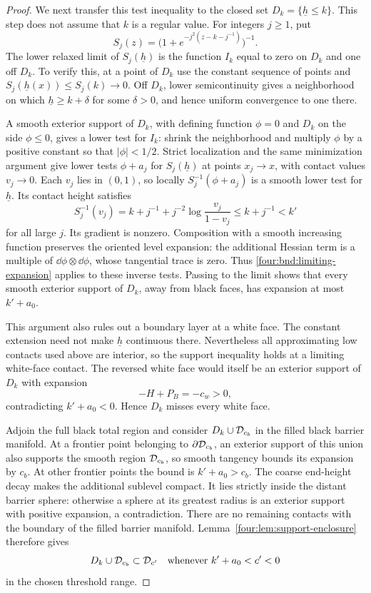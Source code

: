 \begin{proof}
We next transfer this test inequality to the closed set
$D_k=\{\underline h\le k\}$.  This step does not assume that $k$ is a
regular value.  For integers $j\ge1$, put
\[
 S_j(z)=\bigl(1+e^{-j^2(z-k-j^{-1})}\bigr)^{-1}.
\]
The lower relaxed limit of $S_j(\underline h)$ is the function
$I_k$ equal to zero on $D_k$ and one off $D_k$.  To verify this, at a
point of $D_k$ use the constant sequence of points and
$S_j(\underline h(x))\le S_j(k)\to0$.  Off $D_k$, lower
semicontinuity gives a neighborhood on which
$\underline h\ge k+\delta$ for some $\delta>0$, and hence uniform
convergence to one there.

A smooth exterior support of $D_k$, with defining function $\phi=0$
and $D_k$ on the side $\phi\le0$, gives a lower test for $I_k$:
shrink the neighborhood and multiply $\phi$ by a positive constant
so that $|\phi|<1/2$.  Strict localization and the same minimization
argument give lower tests $\phi+a_j$ for $S_j(\underline h)$ at points
$x_j\to x$, with contact values $v_j\to0$.  Each $v_j$ lies in
$(0,1)$, so locally $S_j^{-1}(\phi+a_j)$ is a smooth lower test for
$\underline h$.  Its contact height satisfies
\[
 S_j^{-1}(v_j)=k+j^{-1}+j^{-2}\log\frac{v_j}{1-v_j}
 \le k+j^{-1}<k'
\]
for all large $j$.  Its gradient is nonzero.  Composition with a
smooth increasing function preserves the oriented level expansion:
the additional Hessian term is a multiple of
$\dd\phi\otimes\dd\phi$, whose tangential trace is zero.
Thus \eqref{four:bnd:limiting-expansion} applies to these inverse tests.
Passing to the limit shows that every smooth exterior support of
$D_k$, away from black faces, has expansion at most $k'+a_0$.

This argument also rules out a boundary layer at a white face.  The
constant extension need not make $\underline h$ continuous there.
Nevertheless all approximating low contacts used above are interior,
so the support inequality holds at a limiting white-face contact.
The reversed white face would itself be an exterior support of $D_k$
with expansion
\[
 -H+P_B=-c_w>0,
\]
contradicting $k'+a_0<0$.  Hence $D_k$ misses every white face.

Adjoin the full black total region and consider
$D_k\cup\mathcal D_{c_b}$ in the filled black barrier manifold.  At a
frontier point belonging to $\partial\mathcal D_{c_b}$, an exterior support
of this union also supports the smooth region $\mathcal D_{c_b}$, so smooth
tangency bounds its expansion by $c_b$.  At other frontier points
the bound is $k'+a_0>c_b$.  The coarse end-height decay makes the
additional sublevel compact.  It lies strictly inside the distant
barrier sphere: otherwise a sphere at its greatest radius is an
exterior support with positive expansion, a contradiction.  There
are no remaining contacts with the boundary of the filled barrier
manifold.  Lemma~\ref{four:lem:support-enclosure} therefore gives
\begin{equation}\label{four:bnd:sublevel-enclosure}
 D_k\cup\mathcal D_{c_b}\subset\mathcal D_{c'}
 \quad\hbox{whenever } k'+a_0<c'<0
\end{equation}
in the chosen threshold range.


\end{proof}
